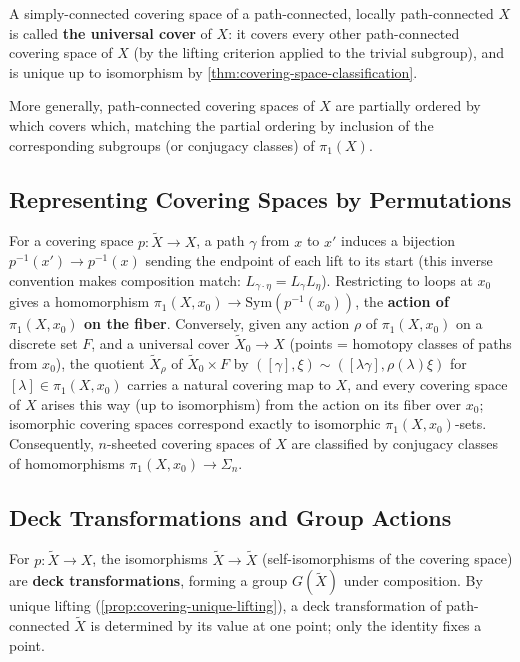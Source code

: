 \begin{definition}
\label{def:universal-cover}
A simply-connected covering space of a path-connected, locally path-connected
$X$ is called \textbf{the universal cover} of $X$: it covers every other path-connected
covering space of $X$ (by the lifting criterion applied to the trivial subgroup), and is
unique up to isomorphism by \cref{thm:covering-space-classification}.
\end{definition}

More generally, path-connected covering spaces of $X$ are partially ordered by which
covers which, matching the partial ordering by inclusion of the corresponding
subgroups (or conjugacy classes) of $\pi_1(X)$.

\subsection*{Representing Covering Spaces by Permutations}

For a covering space $p:\tilde X\to X$, a path $\gamma$ from $x$ to $x'$ induces a bijection
$p^{-1}(x')\to p^{-1}(x)$ sending the endpoint of each lift to its start (this inverse
convention makes composition match: $L_{\gamma\cdot\eta}=L_\gamma L_\eta$). Restricting to loops
at $x_0$ gives a homomorphism $\pi_1(X,x_0)\to \mathrm{Sym}(p^{-1}(x_0))$, the
\textbf{action of $\pi_1(X,x_0)$ on the fiber}. Conversely, given any action $\rho$ of
$\pi_1(X,x_0)$ on a discrete set $F$, and a universal cover $\tilde X_0\to X$ (points =
homotopy classes of paths from $x_0$), the quotient $\tilde X_\rho$ of $\tilde X_0\times F$
by $([\gamma],\xi)\sim([\lambda\gamma],\rho(\lambda)\xi)$ for $[\lambda]\in\pi_1(X,x_0)$ carries a natural
covering map to $X$, and every covering space of $X$ arises this way (up to
isomorphism) from the action on its fiber over $x_0$; isomorphic covering spaces
correspond exactly to isomorphic $\pi_1(X,x_0)$-sets. Consequently, $n$-sheeted
covering spaces of $X$ are classified by conjugacy classes of homomorphisms
$\pi_1(X,x_0) \to \Sigma_n$.

\subsection*{Deck Transformations and Group Actions}

\begin{definition}
\label{def:deck-transformation-group}
For $p:\tilde X\to X$, the isomorphisms $\tilde X\to\tilde X$ (self-isomorphisms of the
covering space) are \textbf{deck transformations}, forming a group $G(\tilde X)$ under
composition. By unique lifting (\cref{prop:covering-unique-lifting}), a deck
transformation of path-connected $\tilde X$ is determined by its value at one point;
only the identity fixes a point.
\end{definition}


